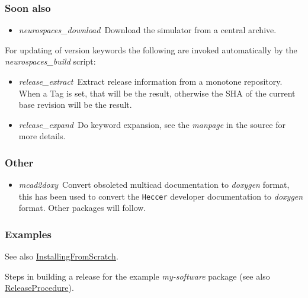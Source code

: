 \documentclass[12pt]{article}
\begin{document}
\subsubsection*{Soon also}

\begin{itemize}
	\item {\it neurospaces\_download}\,\,\,Download the simulator from a central archive.
\end{itemize}
For updating of version keywords the following are invoked automatically by the {\it neurospaces\_build} script:
\begin{itemize}
	\item {\it release\_extract}\,\,\,Extract release information from a monotone repository. When a Tag is set, that will be the result, otherwise the SHA of the current base revision will be the result.
	\item {\it release\_expand}\,\,\,Do keyword expansion, see the {\it manpage} in the source for more details. 
\end{itemize}

\subsubsection*{Other}

\begin{itemize}
	\item {\it mcad2doxy}\,\,\,Convert obsoleted multicad documentation to {\it doxygen} format, this has been used to convert the 
	{\tt Heccer} developer documentation to {\it doxygen} format. Other packages will follow. 
\end{itemize}

\subsubsection*{Examples}

See also \href{../installing-from-scratch/installing-from-scratch.tex}{InstallingFromScratch}.

Steps in building a release for the example {\it my-software} package (see also \href{../release-procedure/release-procedure.tex}{ReleaseProcedure}).
\end{document}
